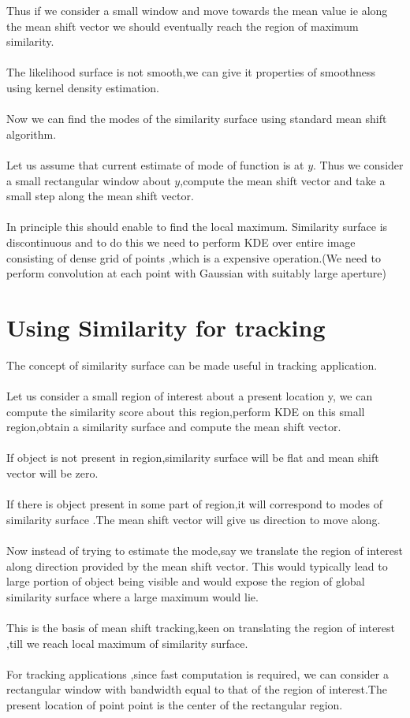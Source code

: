 \documentclass[fontsize=12pt, %
                             paper=a4, %
                             oneside, %
                             captions=tableheading,
                             index=totoc,
                             hyperref]{labbook}
\begin{document}
Thus if we consider a small window and move towards the mean value
ie along the mean shift vector we should eventually reach the region of maximum similarity.
\\\\
The  likelihood surface is not smooth,we can give it properties
of smoothness using kernel density estimation.
\\\\
Now we can find the modes of the similarity surface using standard
mean shift algorithm.
\\\\
Let us assume that current estimate of mode of function is at $y$.
Thus we consider a small rectangular window about $y$,compute
the mean shift vector and take a small step along the mean shift vector.
\\\\
In principle this should enable to find the local maximum.
Similarity surface is discontinuous and to do this we need to perform KDE over entire image
consisting of dense grid of points ,which is a  expensive operation.(We need to perform
convolution at each point with Gaussian with suitably large aperture)
\section{Using Similarity for tracking}
The concept of similarity surface can be made useful in tracking application.
\\\\
Let us consider a small region of interest about a present location y,
we can compute the similarity score about this region,perform KDE
on this small region,obtain a similarity surface and compute the mean shift vector.
\\\\
If object is not present in region,similarity surface will be flat and mean shift
vector will be zero.
\\\\
If there is object present in some part of region,it will correspond
to modes of similarity surface .The mean shift vector will give us
direction to move along.
\\\\
Now instead of trying to estimate the mode,say we translate the region
of interest along direction provided by the mean shift vector.
This would typically lead to large portion of object being visible
and would expose the region  of global similarity surface where
a large maximum would lie.
\\\\
\ECFAugie\color{Orange}
This is the basis of mean  shift tracking,keen on translating the region
of interest ,till we reach local maximum of similarity surface.
\ECFAugie\color{White}
\\\\
For tracking applications ,since fast computation is required,
we can consider a rectangular window with bandwidth equal to that
of the region of interest.The present location of point point
is the center of the rectangular region.
\end{document}
